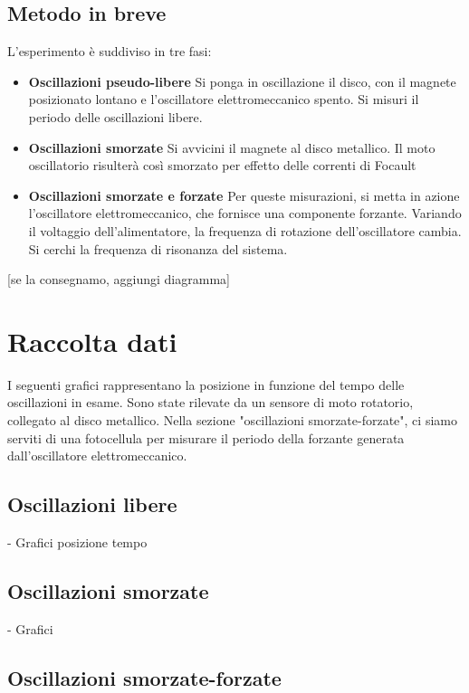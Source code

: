 \documentclass[a4paper,10pt]{report}
\begin{document}
\subsection{Metodo in breve}
L'esperimento è suddiviso in tre fasi:

\begin{itemize}
\item \textbf{Oscillazioni pseudo-libere}
Si ponga in oscillazione il disco, con il magnete  posizionato lontano e l'oscillatore elettromeccanico spento. Si misuri il periodo delle oscillazioni libere.
\item \textbf{Oscillazioni smorzate}
Si avvicini il magnete al disco metallico. Il moto oscillatorio risulterà così smorzato per effetto delle correnti di Focault 
\item \textbf{Oscillazioni smorzate e forzate}
Per queste misurazioni, si metta in azione l'oscillatore elettromeccanico, che fornisce una componente forzante. Variando il voltaggio dell'alimentatore,  la frequenza di rotazione dell'oscillatore cambia. Si cerchi la frequenza di risonanza del sistema.
\end{itemize}

[se la consegnamo, aggiungi diagramma]

\section{Raccolta dati}

I seguenti grafici rappresentano la posizione in funzione del tempo delle oscillazioni in esame. Sono state rilevate da un sensore di moto rotatorio, collegato al disco metallico. 
Nella sezione "oscillazioni smorzate-forzate", ci siamo serviti di una fotocellula per misurare il periodo della forzante generata dall'oscillatore elettromeccanico. 

\subsection{Oscillazioni libere}

- Grafici posizione tempo 

\subsection{Oscillazioni smorzate}

- Grafici 
\subsection{Oscillazioni smorzate-forzate}
\end{document}
